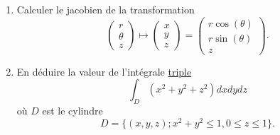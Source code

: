
\begin{exercice}\label{exoOutilsMath-0129}

    \begin{enumerate}
        \item
            Calculer le jacobien de la transformation
            \begin{equation}
                \begin{pmatrix}
                    r    \\ 
                    \theta    \\ 
                    z    
                \end{pmatrix}\mapsto
                \begin{pmatrix}
                    x    \\ 
                    y    \\ 
                    z    
                \end{pmatrix}=\begin{pmatrix}
                    r\cos(\theta)    \\ 
                    r\sin(\theta)    \\ 
                    z    
                \end{pmatrix}.
            \end{equation}
        \item
            En déduire la valeur de l'intégrale \href{http://fr.wikipedia.org/wiki/Fichier:Westmalle_Tripel.jpg}{triple}
            \begin{equation}
                \int_D(x^2+y^2+z^2)dxdydz
            \end{equation}
            où \( D\) est le cylindre
            \begin{equation}
                D=\{ (x,y,z); x^2+y^2\leq 1,0\leq z\leq 1 \}.
            \end{equation}

    \end{enumerate}

\end{exercice}

